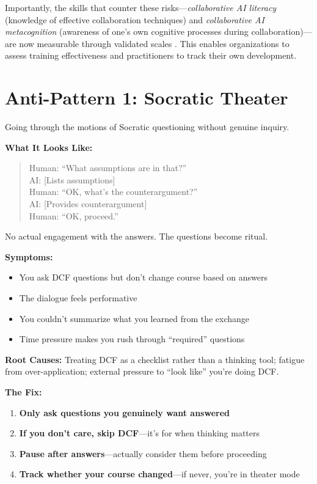 Importantly, the skills that counter these risks---\emph{collaborative AI literacy} (knowledge of effective collaboration techniques) and \emph{collaborative AI metacognition} (awareness of one's own cognitive processes during collaboration)---are now measurable through validated scales \cite{sidra2025scales}. This enables organizations to assess training effectiveness and practitioners to track their own development.

\section{Anti-Pattern 1: Socratic Theater}

Going through the motions of Socratic questioning without genuine inquiry.

\textbf{What It Looks Like:}

\begin{quote}
Human: ``What assumptions are in that?''\\
AI: [Lists assumptions]\\
Human: ``OK, what's the counterargument?''\\
AI: [Provides counterargument]\\
Human: ``OK, proceed.''
\end{quote}

No actual engagement with the answers. The questions become ritual.

\textbf{Symptoms:}
\begin{itemize}
    \item You ask DCF questions but don't change course based on answers
    \item The dialogue feels performative
    \item You couldn't summarize what you learned from the exchange
    \item Time pressure makes you rush through ``required'' questions
\end{itemize}

\textbf{Root Causes:} Treating DCF as a checklist rather than a thinking tool; fatigue from over-application; external pressure to ``look like'' you're doing DCF.

\textbf{The Fix:}
\begin{enumerate}
    \item \textbf{Only ask questions you genuinely want answered}
    \item \textbf{If you don't care, skip DCF}---it's for when thinking matters
    \item \textbf{Pause after answers}---actually consider them before proceeding
    \item \textbf{Track whether your course changed}---if never, you're in theater mode
\end{enumerate}

